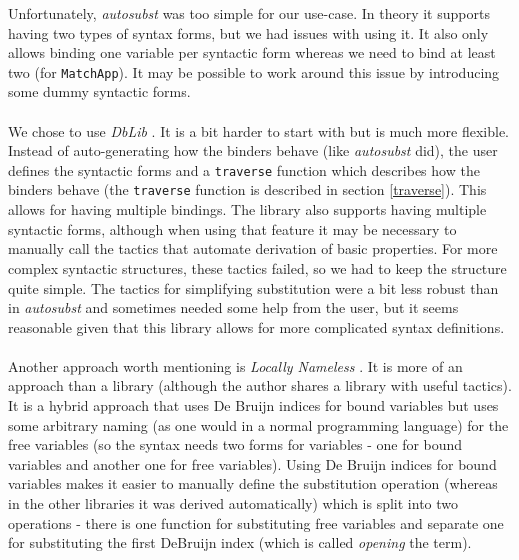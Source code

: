 \documentclass[runningheads]{article}
\begin{document}
Unfortunately, \textit{autosubst} was too simple for our use-case. In theory it supports having two types of syntax forms, but we had issues with using it. It also only allows binding one variable per syntactic form whereas we need to bind at least two (for \verb|MatchApp|). It may be possible to work around this issue by introducing some dummy syntactic forms.


\paragraph{}

We chose to use \textit{DbLib} \cite{dblib}. It is a bit harder to start with but is much more flexible. Instead of auto-generating how the binders behave (like \textit{autosubst} did), the user defines the syntactic forms and a \verb|traverse| function which describes how the binders behave (the \verb|traverse| function is described in section \ref{traverse}). This allows for having multiple bindings. The library also supports having multiple syntactic forms, although when using that feature it may be necessary to manually call the tactics that automate derivation of basic properties. For more complex syntactic structures, these tactics failed, so we had to keep the structure quite simple. The tactics for simplifying substitution were a bit less robust than in \textit{autosubst} and sometimes needed some help from the user, but it seems reasonable given that this library allows for more complicated syntax definitions.

\paragraph{}

Another approach worth mentioning is \textit{Locally Nameless} \cite{locallynameless}. It is more of an approach than a library (although the author shares a library with useful tactics). It is a hybrid approach that uses De Bruijn indices for bound variables but uses some arbitrary naming (as one would in a normal programming language) for the free variables (so the syntax needs two forms for variables - one for bound variables and another one for free variables). Using De Bruijn indices for bound variables makes it easier to manually define the substitution operation (whereas in the other libraries it was derived automatically) which is split into two operations - there is one function for substituting free variables and separate one for substituting the first DeBruijn index (which is called \textit{opening} the term). 
\end{document}
